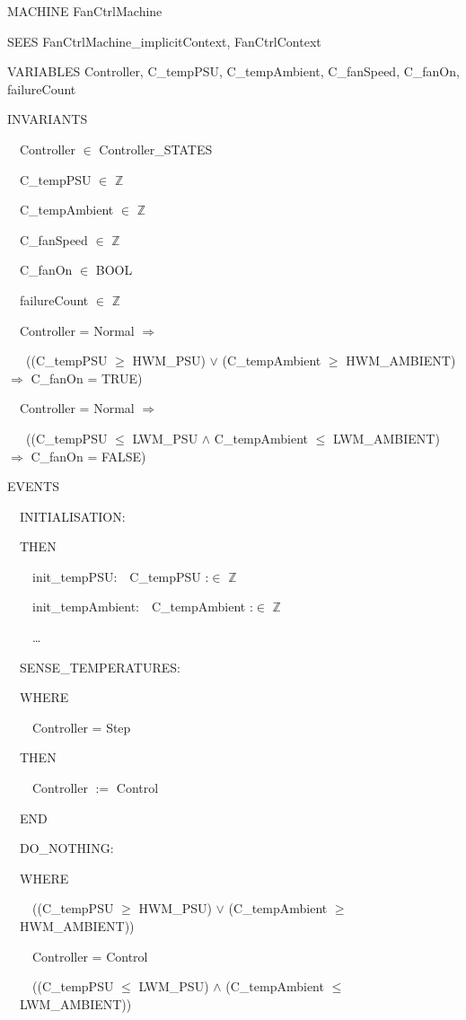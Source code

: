 \documentclass[a4paper]{article}
\title{}
\author{Andy }
\date{2013-08-06}
\begin{document}
MACHINE FanCtrlMachine 

SEES FanCtrlMachine\_implicitContext, FanCtrlContext 

VARIABLES Controller, C\_tempPSU, C\_tempAmbient, C\_fanSpeed, C\_fanOn,
failureCount\ \  \ 

INVARIANTS

\ \ Controller ${\in}$ Controller\_STATES \ 

\ \ C\_tempPSU ${\in}$ $\mathbb{Z}$ \ 

\ \ C\_tempAmbient ${\in}$ $\mathbb{Z}$ \ 

\ \ C\_fanSpeed ${\in}$ $\mathbb{Z}$ \ 

\ \ C\_fanOn ${\in}$ BOOL \ 

\ \ failureCount ${\in}$ $\mathbb{Z}$ \ 

\ \ Controller = Normal $\Rightarrow $ 

\ \  \ ((C\_tempPSU ${\geq}$ HWM\_PSU) ${\vee}$ (C\_tempAmbient ${\geq}$
HWM\_AMBIENT) $\Rightarrow $ C\_fanOn = TRUE)\ \  \ 

\ \ Controller = Normal $\Rightarrow $

\ \  \ ((C\_tempPSU ${\leq}$ LWM\_PSU ${\wedge}$ C\_tempAmbient ${\leq}$
LWM\_AMBIENT) $\Rightarrow $ C\_fanOn = FALSE) \ \ 

EVENTS

\ \ INITIALISATION:\ \ 

\ \ THEN

\ \ \ \ init\_tempPSU:\ \ C\_tempPSU :${\in}$ $\mathbb{Z}$ 

\ \ \ \ init\_tempAmbient:\ \ C\_tempAmbient :${\in}$ $\mathbb{Z}$ 

\ \ \ \ {\dots}


\bigskip

\ \ SENSE\_TEMPERATURES:\ \  \ 

\ \ WHERE

\ \ \ \ Controller = Step \ \ 

\ \ THEN

\ \ \ \ Controller $:=$ Control 

\ \ END


\bigskip

\ \ DO\_NOTHING:\ \  \ 

\ \ WHERE

\ \ \ \ {\textlnot}((C\_tempPSU ${\geq}$ HWM\_PSU) ${\vee}$
(C\_tempAmbient ${\geq}$ \ \ HWM\_AMBIENT)) \ \ 

\ \ \ \ Controller = Control \ \ 

\ \ \ \ {\textlnot}((C\_tempPSU ${\leq}$ LWM\_PSU) ${\wedge}$
(C\_tempAmbient ${\leq}$ \ \ LWM\_AMBIENT)) \ \ 
\end{document}
